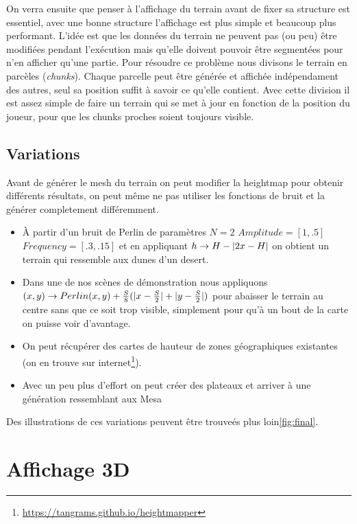 \documentclass{EPUProjetDi}
\DeclarePairedDelimiter\abs{\lvert}{\rvert}%
\begin{document}
On verra ensuite que penser à l'affichage du terrain avant de fixer sa structure est essentiel, avec une bonne structure l'affichage est plus simple et beaucoup plus performant. L'idée est que les données du terrain ne peuvent pas (ou peu) être modifiées pendant l'exécution mais qu'elle doivent pouvoir être segmentées pour n'en afficher qu'une partie.
Pour résoudre ce problème nous divisons le terrain en parcèles (\textit{chunks}). Chaque parcelle peut être générée et affichée indépendament des autres, seul sa position suffit à savoir ce qu'elle contient.
Avec cette division il est assez simple de faire un terrain qui se met à jour en fonction de la position du joueur, pour que les chunks proches soient toujours visible.




\section{Variations}

Avant de générer le mesh du terrain on peut modifier la heightmap pour obtenir différents résultats, on peut même ne pas utiliser les fonctions de bruit et la générer completement différemment.

\begin{itemize}
	\item{À partir d'un bruit de Perlin de paramètres $N=2$ $Amplitude=[1, .5]$ $Frequency=[.3, .15]$ et en appliquant $h\rightarrow H-\abs{2x-H}$ on obtient un terrain qui ressemble aux dunes d'un desert.}
	\item{Dans une de nos scènes de démonstration nous appliquons $(x,y)\rightarrow Perlin(x,y)+\frac{S}{8}(\abs{x-\frac{S}{2}}+\abs{y-\frac{S}{2}})$ pour abaisser le terrain au centre sans que ce soit trop visible, simplement pour qu'à un bout de la carte on puisse voir d'avantage.}
	\item{On peut récupérer des cartes de hauteur de zones géographiques existantes (on en trouve sur internet\footnote{\url{https://tangrams.github.io/heightmapper}}).}
	\item{Avec un peu plus d'effort on peut créer des plateaux et arriver à une génération ressemblant aux Mesa}
\end{itemize}

Des illustrations de ces variations peuvent être trouveés plus loin\ref{fig:final}.


\chapter{Affichage 3D}
\end{document}

